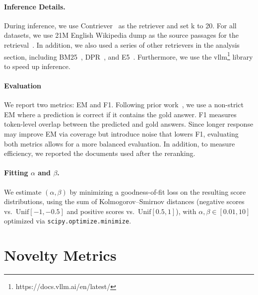 \documentclass[11pt]{article}
\begin{document}
\paragraph{Inference Details.}  During inference, we use Contriever~\citep{izacard2021unsupervised} as the retriever and set k to 20. For all datasets, we use 21M English Wikipedia dump as the source passages for the retrieval~\citep{karpukhin2020dense}. 
In addition, we also used a series of other retrievers in the analysis section, including BM25~\citep{robertson1994some}, DPR~\citep{karpukhin2020dense}, and E5~\citep{wang2022text}. 
Furthermore, we use the vllm\footnote{https://docs.vllm.ai/en/latest/} library to speed up inference.

\paragraph{Evaluation} 
We report two metrics: EM and F1. Following prior work~\citet{asai2023self,mallen2022not}, we use a non-strict EM where a prediction is correct if it contains the gold answer. F1 measures token-level overlap between the predicted and gold answers. Since longer response may improve EM via coverage but introduce noise that lowers F1, evaluating both metrics allows for a more balanced evaluation. 
In addition, to measure efficiency, we reported the documents used after the reranking.

\paragraph{Fitting $\alpha$ and $\beta$.}
We estimate $(\alpha,\beta)$ by minimizing a goodness-of-fit loss on the resulting score distributions, using the sum of Kolmogorov--Smirnov distances (negative scores vs.\ $\mathrm{Unif}[-1,-0.5]$ and positive scores vs.\ $\mathrm{Unif}[0.5,1]$), with $\alpha,\beta\in[0.01,10]$ optimized via \texttt{scipy.optimize.minimize}.


\section{Novelty Metrics}
\label{sec:appendix-redundancy}
\end{document}
